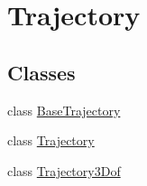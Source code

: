 \hypertarget{group___trajectory}{}\section{Trajectory}
\label{group___trajectory}
\subsection*{Classes}
\begin{DoxyCompactItemize}
\item 
class \hyperlink{group___trajectory_class_base_trajectory}{Base\+Trajectory}
\item 
class \hyperlink{group___trajectory_class_trajectory}{Trajectory}
\item 
class \hyperlink{group___trajectory_class_trajectory3_dof}{Trajectory3\+Dof}
\end{DoxyCompactItemize}
